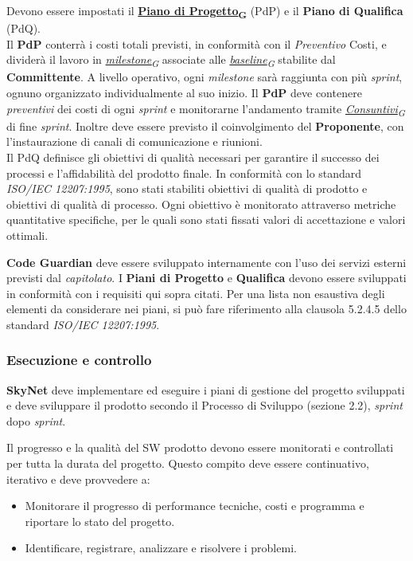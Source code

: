 \documentclass[12pt, a4paper]{article}
\newcommand{\urlglossario}{https://skynetunigroup.github.io/Code_Guardian/Documentazione/RTB/glossario_v1.0.0.pdf} %
\newcommand{\glo}[2]{\href{\urlglossario\#nameddest=#2}{#1\textsubscript{G}}}
\begin{document}
Devono essere impostati il \textbf{\glo{Piano di Progetto}{piano-di-progetto}} (PdP) e il \textbf{Piano di Qualifica} (PdQ).\\
Il \textbf{PdP} conterrà i costi totali previsti, in conformità con il \textit{Preventivo} Costi, e dividerà il lavoro in \textit{\glo{milestone}{milestone}} associate alle \textit{\glo{baseline}{baseline}} stabilite dal \textbf{Committente}. A livello operativo, ogni \textit{milestone} sarà raggiunta con più \textit{sprint}, ognuno organizzato individualmente al suo inizio. Il \textbf{PdP} deve contenere \textit{preventivi} dei costi di ogni \textit{sprint} e monitorarne l'andamento tramite \textit{\glo{Consuntivi}{consuntivo}} di fine \textit{sprint}. Inoltre deve essere previsto il coinvolgimento del \textbf{Proponente}, con l'instaurazione di canali di comunicazione e riunioni.\\
Il PdQ definisce gli obiettivi di qualità necessari per garantire il successo dei processi e l'affidabilità del prodotto finale. In conformità con lo standard \textit{ISO/IEC 12207:1995}, sono stati stabiliti obiettivi di qualità di prodotto e obiettivi di qualità di processo. Ogni obiettivo è monitorato attraverso metriche quantitative specifiche, per le quali sono stati fissati valori di accettazione e valori ottimali.

\textbf{Code Guardian} deve essere sviluppato internamente con l'uso dei servizi esterni previsti dal \textit{capitolato}. I \textbf{Piani di Progetto} e \textbf{Qualifica} devono essere sviluppati in conformità con i requisiti qui sopra citati. Per una lista non esaustiva degli elementi da considerare nei piani, si può fare riferimento alla clausola 5.2.4.5 dello standard \textit{ISO/IEC 12207:1995}.

\subsubsection{Esecuzione e controllo}
\textbf{SkyNet} deve implementare ed eseguire i piani di gestione del progetto sviluppati e deve sviluppare il prodotto secondo il Processo di Sviluppo (sezione 2.2), \textit{sprint} dopo \textit{sprint}. 

Il progresso e la qualità del SW prodotto devono essere monitorati e controllati per tutta la durata del progetto. Questo compito deve essere continuativo, iterativo e deve provvedere a:
\begin{itemize}
    \item Monitorare il progresso di performance tecniche, costi e programma e riportare lo stato del progetto.
    \item Identificare, registrare, analizzare e risolvere i problemi.
\end{itemize}
\end{document}
